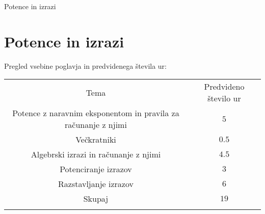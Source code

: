 \begin{priprava}{0}{}{}{Potence in izrazi}{}{}
    
    \chapter{Potence in izrazi}

    \Large{Pregled vsebine poglavja in predvidenega števila ur:}

    \begin{table}[H]
        \centering
        \begin{tabular}{||c|c||} 
        \hhline{|t:==:t|}
        \rowcolor[rgb]{0.843,0.718,0.718} 
        Tema  & Predvideno število ur   \\ 
        \hhline{|:==:|}
        Potence z naravnim eksponentom in pravila za računanje z njimi & $5$    \\ 
        \hline
        Večkratniki & $0.5$    \\ 
        \hline
        Algebrski izrazi in računanje z njimi & $4.5$    \\ 
        \hline
        Potenciranje izrazov & $3$     \\
        \hline
        Razstavljanje izrazov & $6$     \\
        \hhline{|:==:|}
        Skupaj & $19$     \\
        \hhline{|b:==:b|}
        \end{tabular}
    \end{table}


    
\end{priprava}